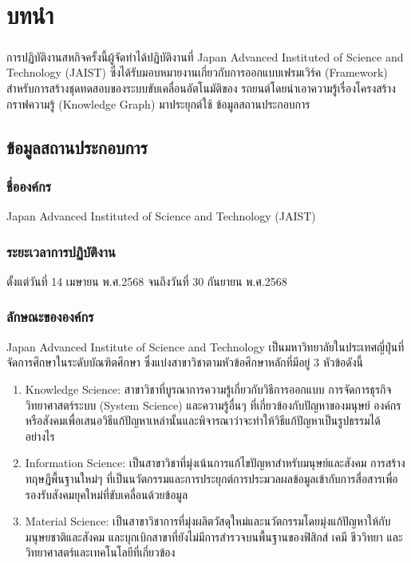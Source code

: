 \chapter{บทนำ}\label{ch:introduction}

\paragraph{}{\sloppy การปฏิบัติงานสหกิจครั้งนี้ผู้จัดทำได้ปฏิบัติงานที่ Japan Advanced Instituted of Science and Technology (JAIST) ซึ่งได้รับมอบหมายงานเกี่ยวกับการออกแบบเฟรมเวิร์ค (Framework) สำหรับการสร้างชุดทดสอบของระบบขับเคลื่อนอัตโนมัติของ รถยนต์โดยนำเอาความรู้เรื่องโครงสร้างกราฟความรู้ (Knowledge Graph) มาประยุกต์ใช้ ข้อมูลสถานประกอบการ\par}

\section{ข้อมูลสถานประกอบการ}\label{sec:company-info}

\subsection{ชื่อองค์กร}\label{subsec:company-name}
Japan Advanced Instituted of Science and Technology (JAIST)

\subsection{ระยะเวลาการปฏิบัติงาน}\label{subsec:duration}
ตั้งแต่วันที่ 14 เมษายน พ.ศ.2568 จนถึงวันที่ 30 กันยายน พ.ศ.2568

\subsection{ลักษณะขององค์กร}\label{subsec:company-type}
Japan Advanced Institute of Science and Technology เป็นมหาวิทยาลัยในประเทศญี่ปุ่นที่จัดการศึกษาในระดับบัณฑิตศึกษา ซึ่งแบ่งสาขาวิชาตามหัวข้อศึกษาหลักที่มีอยู่ 3 หัวข้อดังนี้

\begin{enumerate}
    \item
Knowledge Science: สาขาวิชาที่บูรณาการความรู้เกี่ยวกับวิธีการออกแบบ
การจัดการธุรกิจ วิทยาศาสตร์ระบบ (System Science)
และความรู้อื่นๆ ที่เกี่ยวข้องกับปัญหาของมนุษย์ องค์กร
หรือสังคมเพื่อเสนอวิธีแก้ปัญหาเหล่านั้นและพิจารณาว่าจะทำให้วิธีแก้ปัญหาเป็นรูปธรรมได้อย่างไร
    \item
Information Science: เป็นสาขาวิชาที่มุ่งเน้นการแก้ไขปัญหาสำหรับมนุษย์และสังคม
การสร้างทฤษฎีพื้นฐานใหม่ๆ ที่เป็นนวัตกรรมและการประยุกต์การประมวลผลข้อมูลเข้ากับการสื่อสารเพื่อรองรับสังคมยุคใหม่ที่ขับเคลื่อนด้วยข้อมูล
    \item
Material Science: เป็นสาขาวิชาการที่มุ่งผลิตวัสดุใหม่และนวัตกรรมโดยมุ่งแก้ปัญหาให้กับมนุษยชาติและสังคม
และบุกเบิกสาขาที่ยังไม่มีการสำรวจบนพื้นฐานของฟิสิกส์ เคมี ชีววิทยา
และวิทยาศาสตร์และเทคโนโลยีที่เกี่ยวข้อง
\end{enumerate}

